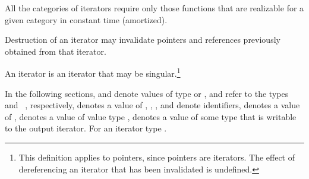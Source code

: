 \pnum
All the categories of iterators require only those functions that are realizable for a given category in
constant time (amortized).

\pnum
Destruction of an iterator may invalidate pointers and references
previously obtained from that iterator.

\pnum
An
iterator is an iterator that may be singular.\footnote{This definition applies to pointers, since pointers are iterators.
The effect of dereferencing an iterator that has been invalidated
is undefined.
}

\pnum
In the following sections,
and
denote values of type
 or ,
 and  refer to the
types  and
~, respectively,
denotes a value of
,
,
,
and
denote identifiers,
denotes a value of
,
denotes a value of value type
,
denotes a value of some type that is writable to the output iterator.
\enternote For an iterator type  . \exitnote

